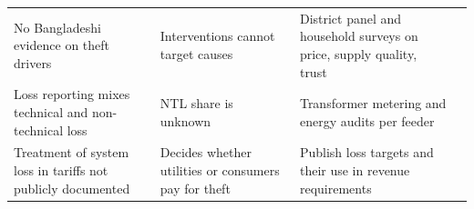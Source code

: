\begin{xltabular}{\textwidth}{>{\raggedright\arraybackslash{}\hsize}X>{\raggedright\arraybackslash{}\hsize}X>{\raggedright\arraybackslash{}\hsize}X>{\raggedright\arraybackslash{}\hsize}X}
No Bangladeshi evidence on theft drivers & Interventions cannot target causes & District panel and household surveys on price, supply quality, trust & \citealp{jamil2014empirical,kasumba2025electricity,monstadt2025power} \\
Loss reporting mixes technical and non-technical loss & NTL share is unknown & Transformer metering and energy audits per feeder & \citealp{powercell2025systemloss} \\
Treatment of system loss in tariffs not publicly documented & Decides whether utilities or consumers pay for theft & Publish loss targets and their use in revenue requirements & \citealp{tbs2026berc,cpd2024tariff} \\
\end{xltabular}
\endgroup
